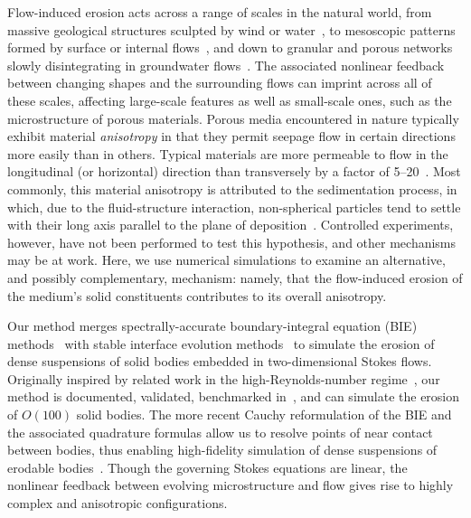 \documentclass[3p]{elsarticle}
\newcommand{\edit}[1]{{\color{red} #1}}
\begin{document}
Flow-induced erosion acts across a range of scales in the natural world, from massive geological structures sculpted by wind or water~\cite{abrams2009growth, perkins2015amplification, mac2020ultra, sharma2022alcove, mac2022morphological}, to mesoscopic patterns formed by surface or internal flows~\cite{berhanu2012shape, bertagni2021hydrodynamic, weady2022anomalous}, and down to granular and porous networks slowly disintegrating in groundwater flows~\cite{chiu2020viscous, szymczak2009wormhole, jager2017channelization, grodzki2019reactive, bizmark2020multiscale, derr2020flow, zareei2022temporal}. The associated nonlinear feedback between changing shapes and the surrounding flows can imprint across all of these scales, affecting large-scale features as well as small-scale ones, such as the microstructure of porous materials. Porous media encountered in nature typically exhibit material {\em anisotropy} in that they permit seepage flow in certain directions more easily than in others. Typical materials are more permeable to flow in the longitudinal (or horizontal) direction than transversely by a factor of 5--20~\cite{bear1988dynamics, anderson2015applied}. Most commonly, this material anisotropy is attributed to the sedimentation process, in which, due to the fluid-structure interaction, non-spherical particles tend to settle with their long axis parallel to the plane of deposition~\cite{bear1988dynamics}. Controlled experiments, however, have not been performed to test this hypothesis, and other mechanisms may be at work. Here, we use numerical simulations to examine an alternative, and possibly complementary, mechanism: namely, that the flow-induced erosion of the medium's solid constituents contributes to its overall anisotropy.

Our method merges \edit{spectrally}-accurate boundary-integral equation (BIE) methods~\cite{baker1986boundary, moore2007evaluation, gray2019boundary} with stable interface evolution methods~\cite{hou-low-she1994, Moore2013} to simulate the erosion of dense suspensions of solid bodies embedded in \edit{two-dimensional Stokes flows.}
Originally inspired by related work in the high-Reynolds-number regime~\cite{Ristroph2012, Moore2013, Huang2015, MooreCPAM2017}, our method is documented, validated, benchmarked in~\cite{quaife2018boundary}, and can simulate the erosion of $O(100)$ solid bodies. The more recent Cauchy reformulation of the BIE and the associated quadrature formulas allow us to resolve points of near contact between bodies, thus enabling high-fidelity simulation of dense suspensions of erodable bodies~\cite{chiu2020viscous}. Though the governing Stokes equations are linear, the nonlinear feedback between evolving microstructure and flow gives rise to highly complex and anisotropic configurations.
	
\end{document}
